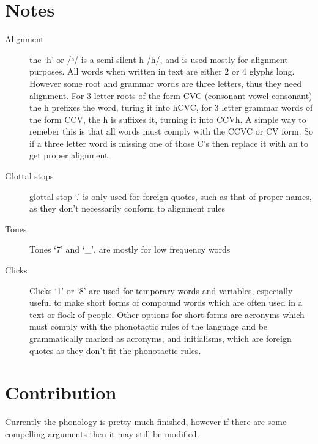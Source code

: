 \section{Notes}
\begin{description}
\item[Alignment] the {\uni{} `h'} or {\uni{} /ʰ/} is a semi silent h {\uni{} /h/}, and is used mostly
for alignment purposes. All words when written in text are 
either 2 or 4 glyphs long. However some root and grammar words
are three letters, thus they need alignment. For 3 letter roots
of the form CVC (consonant vowel consonant) the h prefixes the
word, turing it into hCVC,  for 3 letter grammar words of the
form CCV, the h is suffixes it, turning it into CCVh.  A simple
way to remeber this is that all words must comply with the CCVC
or CV form.  So if a three letter word is missing one of those
C's then replace it with an {} to get proper alignment.
\item[Glottal stops] glottal stop `.' is only used for foreign quotes, such as that
of proper names, as they don't necessarily conform to alignment
rules
\item[Tones] Tones `7' and `\_', are mostly for low frequency words
\item[Clicks] Clicks `1' or `8' are used for temporary words and
variables, especially useful to make short forms of compound
words which are often used in a text or flock of people. 
Other options for short-forms are acronyms which must comply
with the phonotactic rules of the language and be grammatically
marked as acronyms, and initialisms, which are foreign quotes as
they don't fit the phonotactic rules.
\end{description}


\section{Contribution}
Currently the phonology is pretty much finished,
however if there are some compelling arguments then it may still
be modified. 
